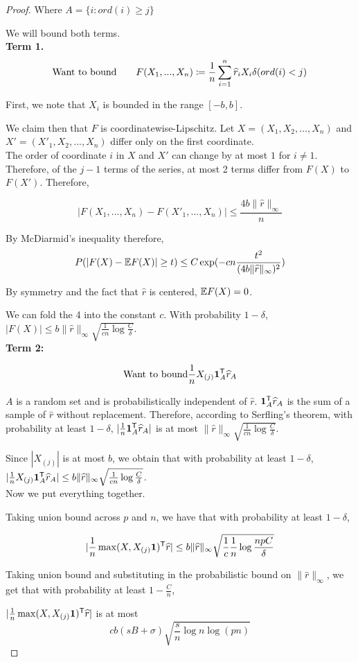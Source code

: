 \documentclass{article}
\begin{document}
\begin{proof}
Where $A = \{ i : ord(i) \geq j\}$

We will bound both terms.\\

\textbf{Term 1.}
\[
\textrm{Want to bound} \qquad F(X_1,...,X_n) \coloneqq \frac{1}{n}\sum_{i=1}^n \widehat{r}_i X_i \delta(ord(i) < j) 
\]

First, we note that $X_i$ is bounded in the range $[-b,b]$. 

We claim then that $F$ is coordinatewise-Lipschitz. Let $X = (X_1, X_2,...,X_n)$ and $X' = (X'_1, X_2, ..., X_n)$ differ only on the first coordinate. \\

The order of coordinate $i$ in $X$ and $X'$ can change by at most $1$ for $i \neq 1$. Therefore, of the $j-1$ terms of the series, at most 2 terms differ from $F(X)$ to $F(X')$. Therefore,

$$ | F(X_1, ..., X_n) - F(X'_1, ..., X_n) | \leq \frac{4 b \|\hat{r}\|_\infty}{n} $$

By McDiarmid's inequality therefore, 
\[
P( | F(X) - \mathbb{E} F(X) | \geq t ) \leq C \exp( - c n\frac{t^2}{ (4 b \|\widehat{r}\|_\infty)^2})
\]

By symmetry and the fact that $\hat{r}$ is centered, $\mathbb{E} F(X) = 0$.

We can fold the 4 into the constant $c$. With probability $1-\delta$, $|F(X)| \leq b \|\hat{r}\|_\infty \sqrt{   \frac{1}{cn} \log \frac{C}{\delta}}$. \\

\textbf{Term 2:}

\[
\textrm{Want to bound}   \frac{1}{n} X_{(j)} \mathbf{1}_A^{\mathsf{T}} \widehat{r}_A
\]

$A$ is a random set and is probabilistically independent of $\hat{r}$.  $\mathbf{1}_A^{\mathsf{T}} \widehat{r}_A$ is the sum of a sample of $\hat{r}$ without replacement. Therefore, according to Serfling's theorem, with probability at least $1-\delta$, $|\frac{1}{n} \mathbf{1}_A^{\mathsf{T}} \widehat{r}_A|$ is at most $\| \hat{r} \|_\infty \sqrt{ \frac{1}{cn} \log \frac{C}{\delta}}$.

Since $|X_{(j)}|$ is at most $b$, we obtain that with probability at least $1-\delta$, $| \frac{1}{n} X_{(j)} \mathbf{1}_A^{\mathsf{T}} \widehat{r}_A| \leq b\| \widehat{r} \|_\infty \sqrt{ \frac{1}{cn} \log \frac{C}{\delta}}$.\\

Now we put everything together.

Taking union bound across $p$ and $n$, we have that with probability at least $1-\delta$, 

\[
| \frac{1}{n} \max(X, X_{(j)}\mathbf{1})^{\mathsf{T}} \widehat{r}| \leq b \|\widehat{r}\|_\infty \sqrt{ \frac{1}{c} \frac{1}{n} \log \frac{np C }{\delta}}
\]

Taking union bound and substituting in the probabilistic bound on $\|\hat{r}\|_\infty$, we get that with probability at least $1-\frac{C}{n}$,

$| \frac{1}{n} \max(X, X_{(j)}\mathbf{1})^{\mathsf{T}} \widehat{r}|$ is at most 
\[
 c b (sB + \sigma) \sqrt{ \frac{s}{n} \log n \log (pn) }
\]

\end{proof}
\end{document}
